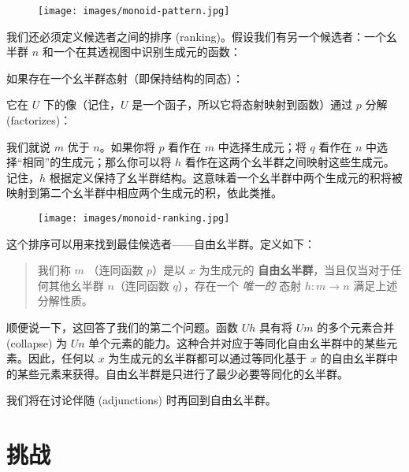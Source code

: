 \begin{figure}[H]
  \centering
  \texttt{[image: images/monoid-pattern.jpg]}
\end{figure}

\noindent
我们还必须定义候选者之间的排序 (ranking)。假设我们有另一个候选者：一个幺半群 $n$ 和一个在其透视图中识别生成元的函数：

如果存在一个幺半群态射（即保持结构的同态）：

它在 $U$ 下的像（记住，$U$ 是一个函子，所以它将态射映射到函数）通过 $p$ 分解 (factorizes)：

我们就说 $m$ 优于 $n$。如果你将 $p$ 看作在 $m$ 中选择生成元；将 $q$ 看作在 $n$ 中选择“相同”的生成元；那么你可以将 $h$ 看作在这两个幺半群之间映射这些生成元。记住，$h$ 根据定义保持了幺半群结构。这意味着一个幺半群中两个生成元的积将被映射到第二个幺半群中相应两个生成元的积，依此类推。

\begin{figure}[H]
  \centering
  \texttt{[image: images/monoid-ranking.jpg]}
\end{figure}

\noindent
这个排序可以用来找到最佳候选者——自由幺半群。定义如下：

\begin{quote}
  我们称 $m$ （连同函数 $p$）是以 $x$ 为生成元的 \textbf{自由幺半群}，当且仅当对于任何其他幺半群 $n$（连同函数 $q$），存在一个 \emph{唯一的} 态射 $h: m \to n$ 满足上述分解性质。
\end{quote}
顺便说一下，这回答了我们的第二个问题。函数 $U h$ 具有将 $U m$ 的多个元素合并 (collapse) 为 $U n$ 单个元素的能力。这种合并对应于等同化自由幺半群中的某些元素。因此，任何以 $x$ 为生成元的幺半群都可以通过等同化基于 $x$ 的自由幺半群中的某些元素来获得。自由幺半群是只进行了最少必要等同化的幺半群。

我们将在讨论伴随 (adjunctions) 时再回到自由幺半群。

\section{挑战}

